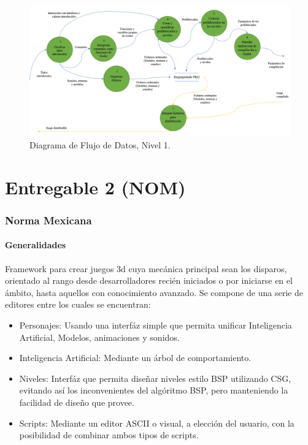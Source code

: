 \documentclass[]{article}
\begin{document}
\begin{figure}[H]
	
	\centering
	\includegraphics[width=1\textwidth]{DFD2}
	\caption{Diagrama de Flujo de Datos, Nivel 1.} 
	\label{DFD1}
	
\end{figure}




  



\newpage
\part{Entregable 2 (NOM)}
\section{Norma Mexicana}
\subsection{Generalidades}
Framework para crear juegos 3d cuya mec\'anica principal sean los disparos, orientado al rango desde desarrolladores reci\'en iniciados o por iniciarse en el \'ambito, hasta aquellos con conocimiento avanzado. Se compone de una serie de editores entre los cuales se encuentran:
\begin{itemize}
	\item Personajes: Usando una interf\'az simple que permita unificar Inteligencia Artificial, Modelos, animaciones y sonidos. 
	\item Inteligencia Artificial: Mediante un \'arbol de comportamiento.
	\item Niveles: Interf\'az que permita dise\~nar niveles estilo BSP utilizando CSG, evitando as\'i los inconvenientes del alg\'oritmo BSP, pero manteniendo la facilidad de dise\~no que provee. 
	\item Scripts: Mediante un editor ASCII o visual, a elecci\'on del usuario, con la posibilidad de combinar ambos tipos de scripts. 
	
\end{itemize}
\end{document}
